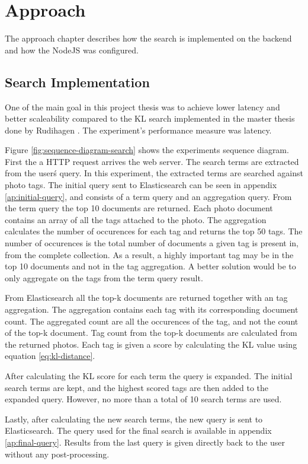 \chapter{Approach}
\label{ch:approach}
The approach chapter describes how the search is implemented on the backend and how the NodeJS was configured.

\section{Search Implementation}
One of the main goal in this project thesis was to achieve lower latency and better scaleability compared to the KL search implemented in the master thesis done by Rudihagen \cite{master-thesis}.
The experiment's performance measure was latency.

Figure \ref{fig:sequence-diagram-search} shows the experiments sequence diagram.
First the a HTTP request arrives the web server.
The search terms are extracted from the user\'s query.
In this experiment, the extracted terms are searched against photo tags.
The initial query sent to Elasticsearch can be seen in appendix \ref{ap:initial-query},
and consists of a term query and an aggregation query.
From the term query the top 10 documents are returned.
Each photo document contains an array of all the tags attached to the photo.
The aggregation calculates the number of occurences for each tag and returns the top 50 tags.
The number of occurences is the total number of documents a given tag is present in, from the complete collection.
As a result, a highly important tag may be in the top 10 documents and not in the tag aggregation.
A better solution would be to only aggregate on the tags from the term query result.

From Elasticsearch all the top-k documents are returned together with an tag aggregation.
The aggregation contains each tag with its corresponding document count.
The aggregated count are all the occurences of the tag, and not the count of the top-k document.
Tag count from the top-k documents are calculated from the returned photos.
Each tag is given a score by calculating the KL value using equation \ref{eq:kl-distance}.

After calculating the KL score for each term the query is expanded.
The initial search terms are kept, and the highest scored tags are then added to the expanded query.
However, no more than a total of 10 search terms are used.

Lastly, after calculating the new search terms, the new query is sent to Elasticsearch.
The query used for the final search is available in appendix \ref{ap:final-query}.
Results from the last query is given directly back to the user without any post-processing.

